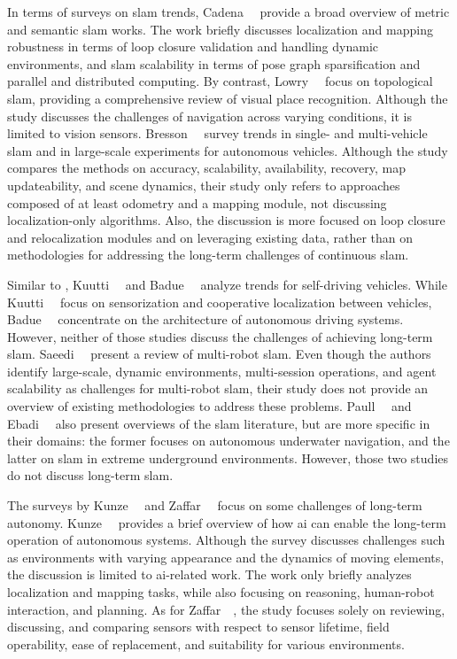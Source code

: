 In terms of surveys on \gls{slam} trends,
Cadena~\etal~\cite{cadena:tro:2016} provide a broad overview
of metric and semantic \gls{slam} works.
The work briefly discusses localization and mapping robustness
in terms of loop closure validation and handling dynamic environments,
and \gls{slam} scalability in terms of pose graph sparsification
and parallel and distributed computing.
By contrast, Lowry~\etal~\cite{lowry:tro:2016} focus on topological
\gls{slam}, providing a comprehensive review of visual place recognition.
Although the study discusses the challenges of navigation
across varying conditions, it is limited to vision sensors.
Bresson~\etal~\cite{bresson:tiv:2017} survey trends in single- and
multi-vehicle \gls{slam} and in large-scale experiments for autonomous vehicles.
Although the study compares the methods on accuracy, scalability, availability,
recovery, map updateability, and scene dynamics,
their study only refers to approaches composed of at least odometry and a
mapping module, not discussing localization-only algorithms.
Also, the discussion is more focused on loop closure and relocalization modules
and on leveraging existing data, rather than on methodologies for
addressing the long-term challenges of continuous \gls{slam}.

Similar to \cite{bresson:tiv:2017},
Kuutti~\etal~\cite{kuutti:jiot:2018} and Badue~\etal~\cite{badue:eswa:2021}
analyze trends for self-driving vehicles.
While Kuutti~\etal~\cite{kuutti:jiot:2018} focus on sensorization and
cooperative localization between vehicles,
Badue~\etal~\cite{badue:eswa:2021} concentrate on the architecture of
autonomous driving systems. However, neither of those studies discuss the
challenges of achieving long-term \gls{slam}.
Saeedi~\etal~\cite{saeedi:jfr:2016} present a review of multi-robot \gls{slam}.
Even though the authors identify large-scale, dynamic environments,
multi-session operations, and agent scalability as challenges for
multi-robot \gls{slam}, their study does not provide an overview of
existing methodologies to address these problems.
Paull~\etal~\cite{paull:joe:2014} and Ebadi~\etal~\cite{ebadi:tro:2024}
also present overviews of the \gls{slam} literature,
but are more specific in their domains:
the former focuses on autonomous underwater navigation,
and the latter on \gls{slam} in extreme underground environments.
However, those two studies do not discuss long-term \gls{slam}.

The surveys by Kunze~\etal~\cite{kunze:ral:2018} and
Zaffar~\etal~\cite{zaffar:ahs:2018} focus on
some challenges of long-term autonomy.
Kunze~\etal~\cite{kunze:ral:2018} provides a brief overview of how \gls{ai}
can enable the long-term operation of autonomous systems.
Although the survey discusses challenges such as environments with
varying appearance and the dynamics of moving elements,
the discussion is limited to \gls{ai}-related work.
The work only briefly analyzes localization and mapping tasks,
while also focusing on reasoning, human-robot interaction, and planning.
As for Zaffar~\etal~\cite{zaffar:ahs:2018},
the study focuses solely on reviewing, discussing, and comparing sensors
with respect to sensor lifetime, field operability, ease of replacement,
and suitability for various environments.

